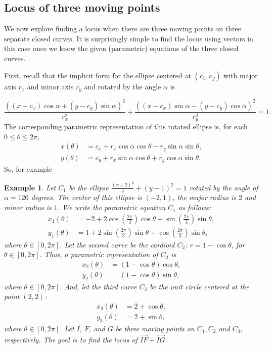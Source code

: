 \documentclass[12pt,a4paper]{article}%
\newtheorem{example}[theorem]{Example}
\begin{document}
\subsection{Locus of three moving points} \label{sec3-2}

We now explore finding a locus when there are three moving points on three
separate closed curves. It is surprisingly simple to find the locus using
vectors in this case once we know the given (parametric) equations of the
three closed curves.

First, recall that the implicit form for the ellipse centered
at $(c_x, c_y)$ with major axis $r_x$ and minor axis $r_y$ and rotated by
the angle $\alpha$ is

\[
\frac{\left(  \left(  x-c_{x}\right)  \cos\alpha+\left(  y-c_{y}\right)
\sin\alpha\right)  ^{2}}{r_{x}^{2}}+\frac{\left(  \left(  x-c_{x}\right)
\sin\alpha-\left(  y-c_{y}\right)  \cos\alpha\right)  ^{2}}{r_{y}^{2}}=1.
\]
The corresponding parametric representation of this rotated ellipse is,
for each $0\le \theta\le 2\pi$,
\begin{align*}
x(\theta)  & =c_{x}+r_{x}\cos\alpha\cos\theta-r_{y}\sin\alpha\sin\theta,\\
y(\theta)  & =c_{y}+r_{x}\sin\alpha\cos\theta+r_{y}\cos\alpha\sin\theta.
\end{align*}
So, for example

\begin{example} \label{ex7}
Let $C_1$ be the ellipse $\frac{\left(x+2\right)^{2}}{4}+(y-1)^{2}=1$
rotated by the angle of $\alpha=120$ degrees. The center of this
ellipse is
$(-2,1)$, the major radius is $2$ and minor radius is $1$. We write the
parametric equation $C_{1}$ as follows:
\begin{align*}
x_{1}(\theta)  & =-2+2\cos\left(  \frac{2\pi}{3}\right)  \cos\theta
-\sin\left(  \frac{2\pi}{3}\right)  \sin\theta,\\
y_{1}(\theta)  & =1+2\sin\left(  \frac{2\pi}{3}\right)  \sin\theta+\cos\left(
\frac{2\pi}{3}\right)  \sin\theta,
\end{align*}
where $\theta\in\left[  0,2\pi\right]$. Let the second curve be the cardioid
$C_{2}$: $r=1-\cos\theta$, for $\theta\in\left[  0,2\pi\right]$. Thus,
a parametric representation of $C_{2}$ is
\begin{align*}
x_{2}\left(  \theta\right)   & =\left(  1-\cos\theta\right)  \cos\theta,\\
y_{2}\left(  \theta\right)   & =\left(  1-\cos\theta\right)  \sin\theta,
\end{align*}
where $\theta\in\left[  0,2\pi\right]$. And, let the third curve $C_3$
be the unit circle centered at the point $(2,2)$:
\begin{align*}
x_{3}(\theta)  & =2+\cos\theta,\\
y_{3}(\theta)  & =2+\sin\theta,
\end{align*}
where $\theta\in\left[  0,2\pi\right]$. Let $I$, $F$, and $G$ be three moving
points on $C_{1},C_{2}$ and $C_{3}$, respectively. The goal is to find the
locus of $\overrightarrow{IF}+\overrightarrow{IG}$.
\end{example}
\end{document}
